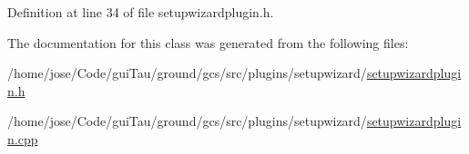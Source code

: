 Definition at line 34 of file setupwizardplugin.\-h.



The documentation for this class was generated from the following files\-:\begin{DoxyCompactItemize}
\item 
/home/jose/\-Code/gui\-Tau/ground/gcs/src/plugins/setupwizard/\hyperlink{setupwizardplugin_8h}{setupwizardplugin.\-h}\item 
/home/jose/\-Code/gui\-Tau/ground/gcs/src/plugins/setupwizard/\hyperlink{setupwizardplugin_8cpp}{setupwizardplugin.\-cpp}\end{DoxyCompactItemize}
